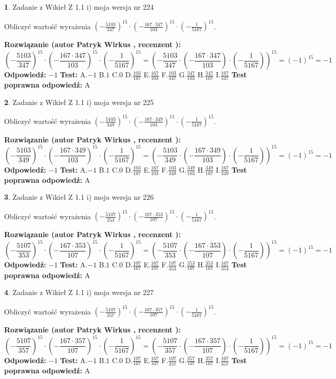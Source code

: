 \documentclass[12pt, a4paper]{article}
\theoremstyle{definition} %
\newtheorem{zad}{}
\newcommand{\zadStart}[1]{\begin{zad}#1\newline}
\newcommand{\zadStop}{\end{zad}}
\newcommand{\rozwStart}[2]{\noindent \textbf{Rozwiązanie (autor #1 , recenzent #2): }\newline}
\newcommand{\rozwStop}{\newline}
\newcommand{\odpStart}{\noindent \textbf{Odpowiedź:}\newline}
\newcommand{\odpStop}{\newline}
\newcommand{\testStart}{\noindent \textbf{Test:}\newline}
\newcommand{\testStop}{\newline}
\newcommand{\kluczStart}{\noindent \textbf{Test poprawna odpowiedź:}\newline}
\newcommand{\kluczStop}{\newline}
\begin{document}
\zadStart{Zadanie z Wikieł Z 1.1 i) moja wersja nr 224}

Obliczyć wartość wyrażenia $(-\frac{5103}{347})^{15} \cdot (-\frac{167 \cdot 347}{103})^{15} \cdot (-\frac{1}{5167})^{15}$.
\zadStop
\rozwStart{Patryk Wirkus}{}
$$(-\frac{5103}{347})^{15} \cdot (-\frac{167 \cdot 347}{103})^{15} \cdot (-\frac{1}{5167})^{15} = (-\frac{5103}{347} \cdot (-\frac{167 \cdot 347}{103}) \cdot (-\frac{1}{5167}))^{15} = (-1)^{15} = -1$$
\rozwStop
\odpStart
$-1$
\odpStop
\testStart
A.$-1$ B.$1$ C.$0$ D.$\frac{103}{167}$ E.$\frac{167}{103}$
F.$\frac{103}{347}$ G.$\frac{347}{103}$
H.$\frac{347}{167}$
I.$\frac{167}{347}$
\testStop
\kluczStart
A
\kluczStop



\zadStart{Zadanie z Wikieł Z 1.1 i) moja wersja nr 225}

Obliczyć wartość wyrażenia $(-\frac{5103}{349})^{15} \cdot (-\frac{167 \cdot 349}{103})^{15} \cdot (-\frac{1}{5167})^{15}$.
\zadStop
\rozwStart{Patryk Wirkus}{}
$$(-\frac{5103}{349})^{15} \cdot (-\frac{167 \cdot 349}{103})^{15} \cdot (-\frac{1}{5167})^{15} = (-\frac{5103}{349} \cdot (-\frac{167 \cdot 349}{103}) \cdot (-\frac{1}{5167}))^{15} = (-1)^{15} = -1$$
\rozwStop
\odpStart
$-1$
\odpStop
\testStart
A.$-1$ B.$1$ C.$0$ D.$\frac{103}{167}$ E.$\frac{167}{103}$
F.$\frac{103}{349}$ G.$\frac{349}{103}$
H.$\frac{349}{167}$
I.$\frac{167}{349}$
\testStop
\kluczStart
A
\kluczStop



\zadStart{Zadanie z Wikieł Z 1.1 i) moja wersja nr 226}

Obliczyć wartość wyrażenia $(-\frac{5107}{353})^{15} \cdot (-\frac{167 \cdot 353}{107})^{15} \cdot (-\frac{1}{5167})^{15}$.
\zadStop
\rozwStart{Patryk Wirkus}{}
$$(-\frac{5107}{353})^{15} \cdot (-\frac{167 \cdot 353}{107})^{15} \cdot (-\frac{1}{5167})^{15} = (-\frac{5107}{353} \cdot (-\frac{167 \cdot 353}{107}) \cdot (-\frac{1}{5167}))^{15} = (-1)^{15} = -1$$
\rozwStop
\odpStart
$-1$
\odpStop
\testStart
A.$-1$ B.$1$ C.$0$ D.$\frac{107}{167}$ E.$\frac{167}{107}$
F.$\frac{107}{353}$ G.$\frac{353}{107}$
H.$\frac{353}{167}$
I.$\frac{167}{353}$
\testStop
\kluczStart
A
\kluczStop



\zadStart{Zadanie z Wikieł Z 1.1 i) moja wersja nr 227}

Obliczyć wartość wyrażenia $(-\frac{5107}{357})^{15} \cdot (-\frac{167 \cdot 357}{107})^{15} \cdot (-\frac{1}{5167})^{15}$.
\zadStop
\rozwStart{Patryk Wirkus}{}
$$(-\frac{5107}{357})^{15} \cdot (-\frac{167 \cdot 357}{107})^{15} \cdot (-\frac{1}{5167})^{15} = (-\frac{5107}{357} \cdot (-\frac{167 \cdot 357}{107}) \cdot (-\frac{1}{5167}))^{15} = (-1)^{15} = -1$$
\rozwStop
\odpStart
$-1$
\odpStop
\testStart
A.$-1$ B.$1$ C.$0$ D.$\frac{107}{167}$ E.$\frac{167}{107}$
F.$\frac{107}{357}$ G.$\frac{357}{107}$
H.$\frac{357}{167}$
I.$\frac{167}{357}$
\testStop
\kluczStart
A
\kluczStop
\end{document}
